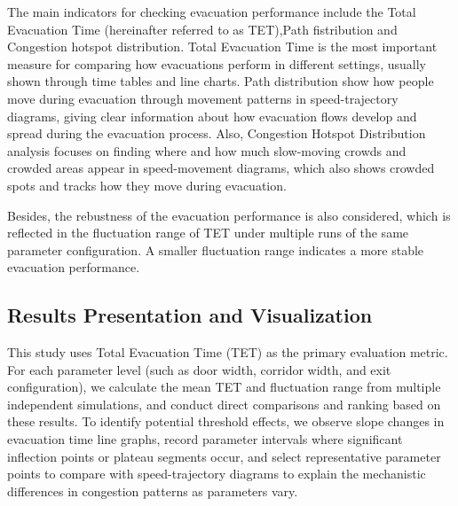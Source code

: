 The main indicators for checking evacuation performance include the Total Evacuation Time (hereinafter referred to as TET),Path fistribution and Congestion hotspot distribution. Total Evacuation Time is the most important measure for comparing how evacuations perform in different settings, usually shown through time tables and line charts. Path distribution show how people move during evacuation through movement patterns in speed-trajectory diagrams, giving clear information about how evacuation flows develop and spread during the evacuation process. Also, Congestion Hotspot Distribution analysis focuses on finding where and how much slow-moving crowds and crowded areas appear in speed-movement diagrams, which also shows crowded spots and tracks how they move during evacuation.

Besides, the rebustness of the evacuation performance is also considered, which is reflected in the fluctuation range of TET under multiple runs of the same parameter configuration. A smaller fluctuation range indicates a more stable evacuation performance. 

\subsection{Results Presentation and Visualization}
This study uses Total Evacuation Time (TET) as the primary evaluation metric. For each parameter level (such as door width, corridor width, and exit configuration), we calculate the mean TET and fluctuation range from multiple independent simulations, and conduct direct comparisons and ranking based on these results. To identify potential threshold effects, we observe slope changes in evacuation time line graphs, record parameter intervals where significant inflection points or plateau segments occur, and select representative parameter points to compare with speed-trajectory diagrams to explain the mechanistic differences in congestion patterns as parameters vary. 
